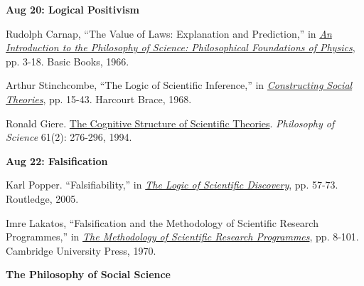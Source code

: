 \documentclass[letterpaper]{article}
\renewenvironment{itemize}{
  \begin{list}{}{
    \setlength{\leftmargin}{1.5em}
  }
}{
  \end{list}
}
\begin{document}
\begin{enumerate}
		\begin{itemize}
		\item {\bf Aug 20: Logical Positivism}
			\begin{itemize}
				\item[$\bullet$] Rudolph Carnap, ``The Value of Laws: Explanation and Prediction,'' in \href{https://archive.org/details/PhilosophicalFoundationsOfPhysics}{\emph{An Introduction to the Philosophy of Science: Philosophical Foundations of Physics}}, pp. 3-18. Basic Books, 1966.
				\item[$\bullet$] Arthur Stinchcombe, ``The Logic of Scientific Inference,'' in \href{http://www.nyu.edu/classes/jackson/design.of.social.research/Readings/Stinchcombe%20-%20Constructing%20Soc%20Thry%20Ch%202.pdf}{\emph{Constructing Social Theories}}, pp. 15-43. Harcourt Brace, 1968.
				\item[$\bullet$] Ronald Giere. \href{https://www.journals.uchicago.edu/doi/pdfplus/10.1086/289800}{The Cognitive Structure of Scientific Theories}. \emph{Philosophy of Science} 61(2): 276-296, 1994.
			\end{itemize}
		\end{itemize}


		\begin{itemize}
		\item {\bf Aug 22: Falsification}
			\begin{itemize}
				\item[$\bullet$] Karl Popper. ``Falsifiability,'' in \href{https://archive.org/details/PopperLogicScientificDiscovery}{\emph{The Logic of Scientific Discovery}}, pp. 57-73. Routledge, 2005.
				\item[$\bullet$] Imre Lakatos, ``Falsification and the Methodology of Scientific Research Programmes,'' in \href{http://strangebeautiful.com/other-texts/lakatos-meth-sci-research-phil-papers-1.pdf}{\emph{The Methodology of Scientific Research Programmes}}, pp. 8-101. Cambridge University Press, 1970. 
			\end{itemize}
		\end{itemize}




\item {\bf The Philosophy of Social Science}
		

\end{enumerate}
\end{document}
